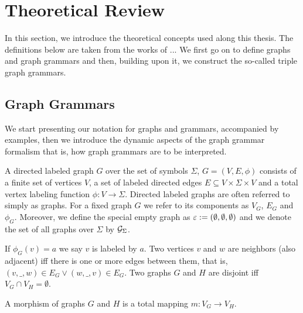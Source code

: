 \documentclass[]{report}
\title{}
\author{William Bombardelli da Silva}
\begin{document}
\maketitle

\begin{abstract}
\end{abstract}

\section{Theoretical Review}
In this section, we introduce the theoretical concepts used along this thesis. The definitions below are taken from the works of ...%
We first go on to define graphs and graph grammars and then, building upon it, we construct the so-called triple graph grammars.

\subsection{Graph Grammars}
We start presenting our notation for graphs and grammars, accompanied by examples, then we introduce the dynamic aspects of the graph grammar formalism that is, how graph grammars are to be interpreted.


\begin{definition}
	\label{def:graph}
	A directed labeled graph $G$ over the set of symbols $\Sigma$, $G = (V, E, \phi)$ consists of a finite set of vertices $V$, a set of labeled directed edges $E \subseteq V \times \Sigma \times V$ and a total vertex labeling function $\phi : V \to \Sigma$. Directed labeled graphs are often referred to simply as graphs. For a fixed graph $G$ we refer to its components as $V_G$, $E_G$ and $\phi_G$. Moreover, we define the special empty graph as $\varepsilon := (\emptyset, \emptyset, \emptyset)$ and we denote the set of all graphs over $\Sigma$ by $\mathcal{G}_{\Sigma}$.
	
	If $\phi_G(v) = a$ we say $v$ is labeled by $a$. Two vertices $v$ and $w$ are neighbors (also adjacent) iff there is one or more edges between them, that is, $(v,\_,w) \in E_G \lor (w,\_,v) \in E_G$. Two graphs $G$ and $H$ are disjoint iff $V_G \cap V_H = \emptyset$.
\end{definition}

\begin{definition}
	\label{def:morphism}
	A morphism of graphs $G$ and $H$ is a total mapping $m: V_G \to V_H$.
\end{definition}
\end{document}
